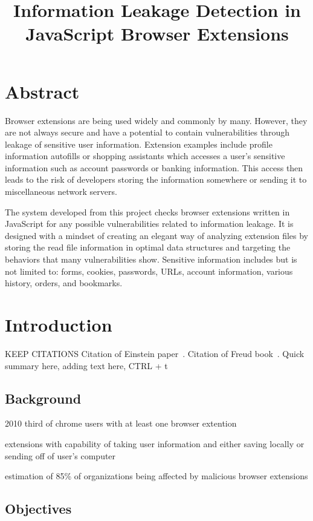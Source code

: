 \documentclass[jou,apacite]{apa6}
\title{Information Leakage Detection in JavaScript Browser Extensions}
\begin{document}
\maketitle    
                        
\section{Abstract}

Browser extensions are being used widely and commonly by many. However, they are not always secure and have a potential to contain vulnerabilities through leakage of sensitive user information. Extension examples include profile information autofills or shopping assistants which accesses a user's sensitive information such as account passwords or banking information. This access then leads to the risk of developers storing the information somewhere or sending it to miscellaneous network servers.

The system developed from this project checks browser extensions written in JavaScript for any possible vulnerabilities related to information leakage. It is designed with a mindset of creating an elegant way of analyzing extension files by storing the read file information in optimal data structures and targeting the behaviors that many vulnerabilities show. Sensitive information includes but is not limited to: forms, cookies, passwords, URLs, account information, various history, orders, and bookmarks.

\section{Introduction}

KEEP CITATIONS Citation of Einstein paper~\cite{Einstein}. Citation of Freud book~\cite{Freud}. Quick summary here, adding text here, CTRL + t

	\subsection{Background}

		2010 third of chrome users with at least one browser extention
	
		extensions with capability of taking user information and either saving locally or sending off of user's computer

		estimation of 85\% of organizations being affected by malicious browser extensions

	\subsection{Objectives}
\end{document}
